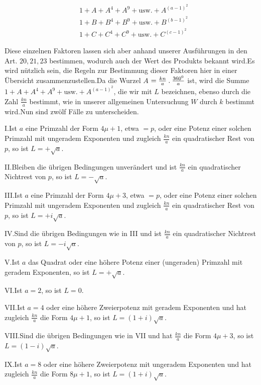 \[
\begin{aligned}
&1+A+A^4+A^9+\text{usw.}+A^{(a-1)^2}\\
&1+B+B^4+B^9+\text{usw.}+B^{(b-1)^2}\\
&1+C+C^4+C^9+\text{usw.}+C^{(c-1)^2}
\end{aligned}
\]

Diese einzelnen Faktoren lassen sich aber anhand unserer Ausführungen in den Art. $20,21,23$ bestimmen, wodurch auch der Wert des Produkts bekannt wird.\quad Es wird nützlich sein, die Regeln zur Bestimmung dieser Faktoren hier in einer Übersicht zusammenzustellen.\quad Da die Wurzel $A$ $=\frac{kn}{a}\mathbin{.}\frac{360^0}{a}$ ist, wird die Summe $1+A+A^4+A^9+\text{usw.}+A^{(a-1)^2}$, die wir mit $L$ bezeichnen, ebenso durch die Zahl $\frac{kn}{a}$ bestimmt, wie in unserer allgemeinen Untersuchung $W$ durch $k$ bestimmt wird.\quad Nun sind zwölf Fälle zu unterscheiden.

I.\quad Ist $a$ eine Primzahl der Form $4\mu+1$, etwa $=p$, oder eine Potenz einer solchen Primzahl mit ungeradem Exponenten und zugleich $\frac{kn}{a}$ ein quadratischer Rest von $p$, so ist $L=+\surd a$.

II.\quad Bleiben die übrigen Bedingungen unverändert und ist $\frac{kn}{a}$ ein quadratischer Nichtrest von $p$, so ist $L=-\surd a$.

III.\quad Ist $a$ eine Primzahl der Form $4\mu+3$, etwa $=p$, oder eine Potenz einer solchen Primzahl mit ungeradem Exponenten und zugleich $\frac{kn}{a}$ ein quadratischer Rest von $p$, so ist $L=+i\surd a$.

IV.\quad Sind die übrigen Bedingungen wie in III und ist $\frac{kn}{a}$ ein quadratischer Nichtrest von $p$, so ist $L=-i\surd a$.

V.\quad Ist $a$ das Quadrat oder eine höhere Potenz einer (ungeraden) Primzahl mit geradem Exponenten, so ist $L=+\surd a$.

VI.\quad Ist $a=2$, so ist $L=0$.

VII.\quad Ist $a=4$ oder eine höhere Zweierpotenz mit geradem Exponenten und hat zugleich $\frac{kn}{a}$ die Form $4\mu+1$, so ist $L=(1+i)\surd a$.

VIII.\quad Sind die übrigen Bedingungen wie in VII und hat $\frac{kn}{a}$ die Form $4\mu+3$, so ist $L=(1-i)\surd a$.

IX.\quad Ist $a=8$ oder eine höhere Zweierpotenz mit ungeradem Exponenten und hat zugleich $\frac{kn}{a}$ die Form $8\mu+1$, so ist $L=(1+i)\surd a$.


